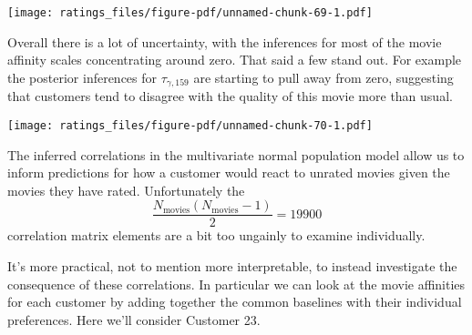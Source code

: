 \documentclass[
  letterpaper,
  DIV=11,
  numbers=noendperiod]{scrartcl}
\newenvironment{Shaded}{\begin{snugshade}}{\end{snugshade}}
\newcommand{\AttributeTok}[1]{\textcolor[rgb]{0.40,0.45,0.13}{#1}}
\newcommand{\DecValTok}[1]{\textcolor[rgb]{0.68,0.00,0.00}{#1}}
\newcommand{\FunctionTok}[1]{\textcolor[rgb]{0.28,0.35,0.67}{#1}}
\newcommand{\NormalTok}[1]{\textcolor[rgb]{0.00,0.23,0.31}{#1}}
\newcommand{\OtherTok}[1]{\textcolor[rgb]{0.00,0.23,0.31}{#1}}
\newcommand{\SpecialCharTok}[1]{\textcolor[rgb]{0.37,0.37,0.37}{#1}}
\newcommand{\StringTok}[1]{\textcolor[rgb]{0.13,0.47,0.30}{#1}}
\begin{document}
\texttt{[image: ratings\_files/figure-pdf/unnamed-chunk-69-1.pdf]}

Overall there is a lot of uncertainty, with the inferences for most of
the movie affinity scales concentrating around zero. That said a few
stand out. For example the posterior inferences for
\(\tau_{\gamma, 159}\) are starting to pull away from zero, suggesting
that customers tend to disagree with the quality of this movie more than
usual.

\begin{Shaded}
\end{Shaded}

\texttt{[image: ratings\_files/figure-pdf/unnamed-chunk-70-1.pdf]}

The inferred correlations in the multivariate normal population model
allow us to inform predictions for how a customer would react to unrated
movies given the movies they have rated. Unfortunately the \[
\frac{ N_{\text{movies}} (N_{\text{movies}} - 1) }{ 2 }
=
19900
\] correlation matrix elements are a bit too ungainly to examine
individually.

It's more practical, not to mention more interpretable, to instead
investigate the consequence of these correlations. In particular we can
look at the movie affinities for each customer by adding together the
common baselines with their individual preferences. Here we'll consider
Customer 23.
\end{document}
